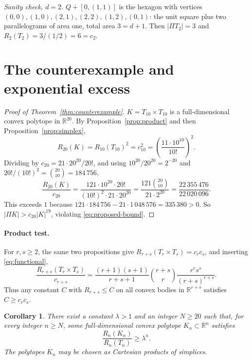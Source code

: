 \documentclass[11pt]{article}
\newtheorem{corollary}[theorem]{Corollary}
\newcommand{\R}{\mathbb R}
\begin{document}
\emph{Sanity check, \(d=2\).} \(Q+[0,(1,1)]\) is the hexagon with vertices \((0,0),(1,0),(2,1),(2,2),(1,2),(0,1)\): the unit square plus two parallelograms of area one, total area \(3=d+1\). Then \(|\Pi T_2|=3\) and \(R_2(T_2)=3/(1/2)=6=c_2\).

\section{The counterexample and exponential excess}\label{sec:counterexample}

\begin{proof}[Proof of Theorem~\ref{thm:counterexample}]
\(K=T_{10}\times T_{10}\) is a full-dimensional convex polytope in \(\R^{20}\). By Proposition~\ref{prop:product} and then Proposition~\ref{prop:simplex},
\[
 R_{20}(K)=R_{10}(T_{10})^2=c_{10}^2=\left(\frac{11\cdot10^{10}}{10!}\right)^2 .
\]
Dividing by \(c_{20}=21\cdot20^{20}/20!\), and using \(10^{20}/20^{20}=2^{-20}\) and \(20!/(10!)^2=\binom{20}{10}=184\,756\),
\[
 \frac{R_{20}(K)}{c_{20}}
 =\frac{121\cdot10^{20}\cdot20!}{(10!)^2\cdot21\cdot20^{20}}
 =\frac{121\binom{20}{10}}{21\cdot2^{20}}
 =\frac{22\,355\,476}{22\,020\,096}.
\]
This exceeds \(1\) because \(121\cdot184\,756-21\cdot1\,048\,576=335\,380>0\). So \(|\Pi K|>c_{20}|K|^{19}\), violating \eqref{eq:proposed-bound}.
\end{proof}

\paragraph{Product test.} For \(r,s\ge2\), the same two propositions give \(R_{r+s}(T_r\times T_s)=c_rc_s\), and inserting \eqref{eq:functional},
\[
 \frac{R_{r+s}(T_r\times T_s)}{c_{r+s}}
 =\frac{(r+1)(s+1)}{r+s+1}\binom{r+s}{r}\frac{r^rs^s}{(r+s)^{r+s}}.
\]
Thus any constant \(C\) with \(R_{r+s}\le C\) on all convex bodies in \(\R^{r+s}\) satisfies \(C\ge c_rc_s\).

\begin{corollary}\label{cor:exponential-excess}
There exist a constant \(\lambda>1\) and an integer \(N\ge20\) such that, for every integer \(n\ge N\), some full-dimensional convex polytope \(K_n\subset\R^n\) satisfies
\[
 \frac{R_n(K_n)}{R_n(T_n)}\ge\lambda^n.
\]
The polytopes \(K_n\) may be chosen as Cartesian products of simplices.
\end{corollary}
\end{document}
